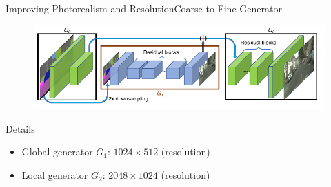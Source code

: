 \documentclass{beamer}
\begin{document}
\begin{frame}{Improving Photorealism and Resolution}{Coarse-to-Fine Generator}
	\begin{figure}
	\centering
	\includegraphics[height=0.4\textheight]{images/structure}
\end{figure}
%
%
\begin{beamerboxesrounded}[upper=uppercol,lower=lowercol,shadow=false]{Details}
\begin{itemize}
	\item
	Global generator $G_1$: $1024\times512$ (resolution)
	\item
	Local generator $G_2$: $2048\times1024$ (resolution)
\end{itemize}
\end{beamerboxesrounded}
\end{frame}
\end{document}
